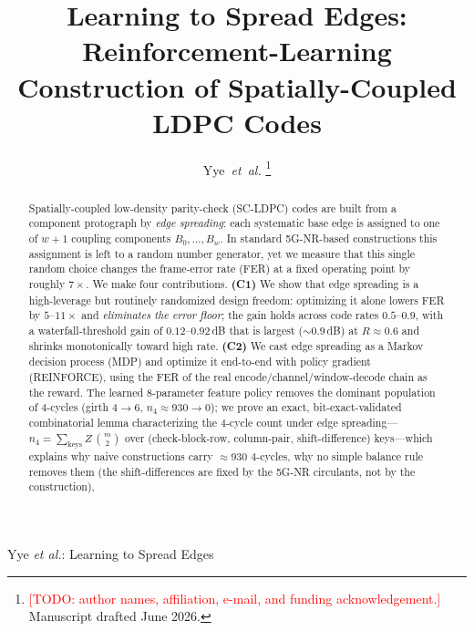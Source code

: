 \documentclass[journal]{IEEEtran}
\newcommand{\TODO}[1]{\textcolor{red}{[TODO: #1]}}
\begin{document}
\title{Learning to Spread Edges: Reinforcement-Learning\\
Construction of Spatially-Coupled LDPC Codes}

\author{Yye~\textit{et~al.}%
\thanks{\TODO{author names, affiliation, e-mail, and funding acknowledgement.}
Manuscript drafted June 2026.}}

%
{Yye \MakeLowercase{\textit{et al.}}: Learning to Spread Edges}

\maketitle

\begin{abstract}
Spatially-coupled low-density parity-check (SC-LDPC) codes are built from a
component protograph by \emph{edge spreading}: each systematic base edge is
assigned to one of $w{+}1$ coupling components $B_0,\dots,B_w$. In standard
5G-NR-based constructions this assignment is left to a random number generator,
yet we measure that this single random choice changes the frame-error rate
(FER) at a fixed operating point by roughly $7\times$. We make four
contributions. \textbf{(C1)} We show that edge spreading is a high-leverage but
routinely randomized design freedom: optimizing it alone lowers FER by
$5$--$11\times$ and \emph{eliminates the error floor}; the gain holds across
code rates $0.5$--$0.9$, with a waterfall-threshold gain of $0.12$--$0.92$\,dB
that is largest ($\sim\!0.9$\,dB) at $R\!\approx\!0.6$ and shrinks monotonically
toward high rate. \textbf{(C2)} We cast edge spreading as a Markov decision
process (MDP) and optimize it end-to-end with policy gradient (REINFORCE),
using the FER of the real encode/channel/window-decode chain as the reward. The
learned $8$-parameter feature policy removes the dominant population of
$4$-cycles (girth $4\!\to\!6$, $n_4\!\approx\!930\!\to\!0$); we prove an exact,
bit-exact-validated combinatorial lemma characterizing the $4$-cycle count under
edge spreading---$n_4=\sum_{\mathrm{keys}} Z\,\binom{m}{2}$ over (check-block-row,
column-pair, shift-difference) keys---which explains why naive constructions
carry $\approx\!930$ $4$-cycles, why no simple balance rule removes them (the
shift-differences are fixed by the 5G-NR circulants, not by the construction),

\end{abstract}
\end{document}
